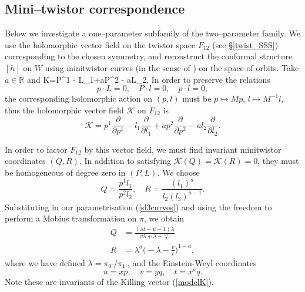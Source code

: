\subsection{Mini--twistor correspondence}
\label{mini_twistor}
Below we investigate a one--parameter subfamily of the two--parameter family. We use the holomorphic vector field on 
the twistor space
$F_{12}$  (see \S\ref{twist_SSS})
corresponding to the chosen symmetry, and reconstruct the conformal structure $[h]$ on $W$ using minitwistor curves 
(in the sense of \cite{hitchin})
on the space of orbits. Take $a\in \mathbb{R}$ and
\be
\label{modelK}
K=P^1 - L_1+aP^2 - aL_2,
\ee
In order to preserve the relations
\[
p\cdot L=0,\quad P\cdot l=0,\quad p\cdot l=0, 
\]
the corresponding holomorphic action on $(p,l)$ must be $p\mapsto Mp$, $l\mapsto M^{-1}l$, thus the holomorphic vector field $\mathcal{K}$ on $F_{12}$ is
\[
\mathcal{K}=p^1\frac{\partial}{\partial p^1} - l_1\frac{\partial}{\partial l_1}+ap^2\frac{\partial}{\partial p^2} - al_2\frac{\partial}{\partial l_2}.
\]

In order to factor $F_{12}$ by this vector field, we must find invariant minitwistor coordinates $(Q,R)$. In addition to satisfying $\mathcal{K}(Q)=\mathcal{K}(R)=0$, they must be homogeneous of degree zero in $(P,L)$. We choose
\[
Q=\frac{p^1l_1}{p^2l_2},\quad R=\frac{(l_1)^a}{l_2(l_3)^{a-1}}.
\]
Substituting in our parametrisation (\ref{sl3curves}) and using the freedom to perform a Mobius transformation on $\pi$, we obtain
\begin{align}
\label{QR}
Q &= \frac{(\lambda t-u-1)\lambda}{v\lambda+\lambda-\frac{uv}{t}}\\
R &= \lambda^a\Big(-\lambda-\frac{v}{t}\Big)^{1-a},\nonumber
\end{align}
where we have defined $\lambda=\pi_{0'}/\pi_{1'}$,  and the Einstein-Weyl coordinates
\[
u=xp,\quad v=yq, \quad t=x^aq.
\]
Note these are invariants of the Killing vector (\ref{modelK}).

